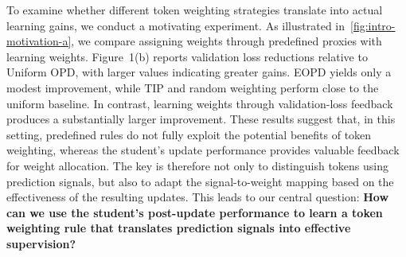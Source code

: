 \documentclass{article}
\theoremstyle{plain}
\theoremstyle{definition}
\theoremstyle{remark}
\begin{document}
To examine whether different token weighting strategies translate into actual learning gains, we conduct a motivating experiment. As illustrated in~\cref{fig:intro-motivation-a}, we compare assigning weights through predefined proxies with learning weights. Figure~1(b) reports validation loss reductions relative to Uniform OPD, with larger values indicating greater gains. EOPD yields only a modest improvement, while TIP and random weighting perform close to the uniform baseline. In contrast, learning weights through validation-loss feedback produces a substantially larger improvement. These results suggest that, in this setting, predefined rules do not fully exploit the potential benefits of token weighting, whereas the student's update performance provides valuable feedback for weight allocation. The key is therefore not only to distinguish tokens using prediction signals, but also to adapt the signal-to-weight mapping based on the effectiveness of the resulting updates. This leads to our central question: \textbf{How can we use the student's post-update performance to learn a token weighting rule that translates prediction signals into effective supervision?}

\end{document}
